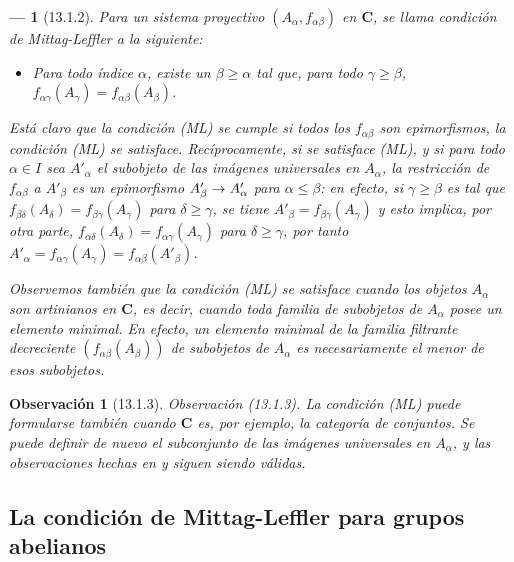 \documentclass[10pt,oneside,openany]{book}
\theoremstyle{egaenv}\newtheorem*{env}{---}
\theoremstyle{egastatement}
\theoremstyle{egadescription}
\newtheorem*{remark}{Observación}
\renewcommand{\leq}{\leqslant}
\renewcommand{\geq}{\geqslant}
\renewcommand{\to}{\mathchoice{\longrightarrow}{\rightarrow}{\rightarrow}{\rightarrow}}
\begin{document}
\begin{env}[13.1.2]
\label{0.13.1.2}
\label{0.13.1.2-fr}
Para un sistema proyectivo $(A_\alpha,f_{\alpha\beta})$ en $\boldsymbol{C}$,
se llama \emph{condición de Mittag-Leffler} a la siguiente:
\begin{itemize}
  \item[(ML)]
  \emph{Para todo índice $\alpha$, existe un $\beta\geq\alpha$ tal
  que, para todo $\gamma\geq\beta$,}
  $f_{\alpha\gamma}(A_\gamma)=f_{\alpha\beta}(A_\beta)$.
\end{itemize}

Está claro que la condición (ML) se cumple si todos los
$f_{\alpha\beta}$ son \emph{epimorfismos}, la condición (ML) se satisface. Recíprocamente, si se satisface (ML), y si para todo $\alpha\in I$ sea $A'_\alpha$ el subobjeto de las imágenes
universales en $A_\alpha$, la restricción de $f_{\alpha\beta}$ a $A'_\beta$ es un \emph{epimorfismo}
$A'_\beta\to A'_\alpha$ para $\alpha\leq\beta$: en efecto, si $\gamma\geq\beta$ es tal que $f_{\beta\delta}(A_\delta)=f_{\beta\gamma}(A_\gamma)$ para $\delta\geq\gamma$, se tiene
$A'_\beta=f_{\beta\gamma}(A_\gamma)$ y esto implica, por otra parte, $f_{\alpha\delta}(A_\delta)=f_{\alpha\gamma}(A_\gamma)$ para $\delta\geq\gamma$, por tanto $A'_\alpha=f_{\alpha\gamma}(A_\gamma)=f_{\alpha\beta}(A'_\beta)$.

Observemos también que la condición (ML) se satisface cuando los objetos $A_\alpha$ son
\emph{artinianos} en $\boldsymbol{C}$, es decir, cuando toda familia de
subobjetos de $A_\alpha$ posee un elemento minimal.
En efecto, un elemento minimal de la familia filtrante decreciente
$(f_{\alpha\beta}(A_\beta))$ de subobjetos de $A_\alpha$
es necesariamente el menor de esos subobjetos.
\end{env}

\begin{remark}[13.1.3]
\label{0.13.1.3}
\label{0.13.1.3-fr}
\emph{Observación} (13.1.3).
La condición (ML) puede formularse también cuando $\boldsymbol{C}$ es, por
ejemplo, la categoría de conjuntos.
Se puede definir de nuevo el subconjunto de las imágenes universales en
$A_\alpha$, y las observaciones hechas en  y
 siguen siendo válidas.
\end{remark}

\subsection{La condición de Mittag-Leffler para grupos abelianos}
\label{subsection:0.13.2}
\label{subsection:0.13.2-fr}
\end{document}
